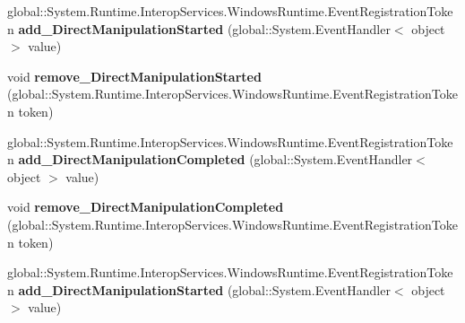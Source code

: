 \begin{DoxyCompactItemize}
\item 
\mbox{\label{interface_windows_1_1_u_i_1_1_xaml_1_1_controls_1_1_i_scroll_viewer3_a0839b9502b9866f437c3f3f23c2c0f79}} 
global\+::\+System.\+Runtime.\+Interop\+Services.\+Windows\+Runtime.\+Event\+Registration\+Token {\bfseries add\+\_\+\+Direct\+Manipulation\+Started} (global\+::\+System.\+Event\+Handler$<$ object $>$ value)
\item 
\mbox{\label{interface_windows_1_1_u_i_1_1_xaml_1_1_controls_1_1_i_scroll_viewer3_a75d6c9a9bf666134494a9293cd9bfa83}} 
void {\bfseries remove\+\_\+\+Direct\+Manipulation\+Started} (global\+::\+System.\+Runtime.\+Interop\+Services.\+Windows\+Runtime.\+Event\+Registration\+Token token)
\item 
\mbox{\label{interface_windows_1_1_u_i_1_1_xaml_1_1_controls_1_1_i_scroll_viewer3_a111ec1d571f2a6f03d6e721b6314de30}} 
global\+::\+System.\+Runtime.\+Interop\+Services.\+Windows\+Runtime.\+Event\+Registration\+Token {\bfseries add\+\_\+\+Direct\+Manipulation\+Completed} (global\+::\+System.\+Event\+Handler$<$ object $>$ value)
\item 
\mbox{\label{interface_windows_1_1_u_i_1_1_xaml_1_1_controls_1_1_i_scroll_viewer3_ac49adea893c6168aba5af298913c0b69}} 
void {\bfseries remove\+\_\+\+Direct\+Manipulation\+Completed} (global\+::\+System.\+Runtime.\+Interop\+Services.\+Windows\+Runtime.\+Event\+Registration\+Token token)
\item 
\mbox{\label{interface_windows_1_1_u_i_1_1_xaml_1_1_controls_1_1_i_scroll_viewer3_a0839b9502b9866f437c3f3f23c2c0f79}} 
global\+::\+System.\+Runtime.\+Interop\+Services.\+Windows\+Runtime.\+Event\+Registration\+Token {\bfseries add\+\_\+\+Direct\+Manipulation\+Started} (global\+::\+System.\+Event\+Handler$<$ object $>$ value)
\item 
\mbox{\label{interface_windows_1_1_u_i_1_1_xaml_1_1_controls_1_1_i_scroll_viewer3_a75d6c9a9bf666134494a9293cd9bfa83}} 

\end{DoxyCompactItemize}
